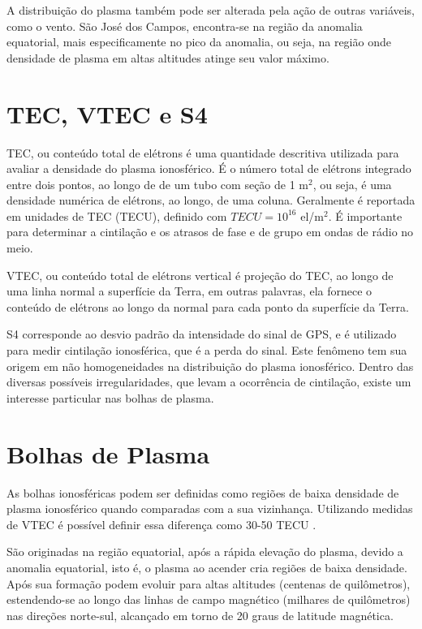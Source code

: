A distribuição do plasma também pode ser alterada pela ação de outras variáveis, como o vento. São José dos Campos, encontra-se na região da anomalia equatorial, mais especificamente no pico da anomalia, ou seja, na região onde densidade de plasma em altas altitudes atinge seu valor máximo.

\section{TEC, VTEC e S4}
TEC, ou conteúdo total de elétrons é uma quantidade descritiva utilizada para avaliar a densidade do plasma ionosférico. É o número total de elétrons integrado entre dois pontos, ao longo de de um tubo com seção de 1 m$^2$, ou seja, é uma densidade numérica de elétrons, ao longo, de uma coluna. Geralmente é reportada em unidades de TEC (TECU), definido com $TECU=10^{16}$ el/m$^2$. É importante para determinar a cintilação e os atrasos de fase e de grupo em ondas de rádio no meio.

VTEC, ou conteúdo total de elétrons vertical é projeção do TEC, ao longo de uma linha normal a superfície da Terra, em outras palavras, ela fornece o conteúdo de elétrons ao longo da normal para cada ponto da superfície da Terra.

S4 corresponde ao desvio padrão da intensidade do sinal de GPS, e é utilizado para medir cintilação ionosférica, que é a perda do sinal. Este fenômeno tem sua origem em não homogeneidades na distribuição do plasma ionosférico. Dentro das diversas possíveis irregularidades, que levam a ocorrência de cintilação, existe um interesse particular nas bolhas de plasma.

\section{Bolhas de Plasma}

As bolhas ionosféricas podem ser definidas como regiões de baixa densidade de plasma ionosférico quando comparadas com a sua vizinhança. Utilizando medidas de VTEC é possível definir essa diferença como 30-50 TECU \cite{TAKAHASHI:2006}.

São originadas na região equatorial, após a rápida elevação do plasma, devido a anomalia equatorial, isto é, o plasma ao acender cria regiões de baixa densidade. Após sua formação podem evoluir para altas altitudes (centenas de quilômetros), estendendo-se ao longo das linhas de campo magnético (milhares de quilômetros) nas direções norte-sul, alcançado em torno de 20 graus de latitude magnética.
